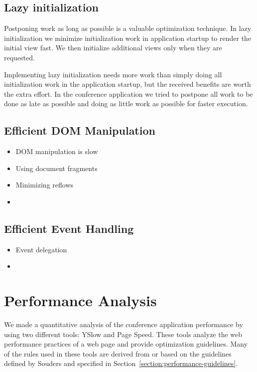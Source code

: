 \subsection{Lazy initialization}

Postponing work as long as possible is a valuable optimization
technique. In lazy initialization we minimize initialization work in
application startup to render the initial view fast. We then
initialize additional views only when they are requested.

Implementing lazy initialization needs more work than simply doing all
initialization work in the application startup, but the received
benefits are worth the extra effort. In the conference application we
tried to postpone all work to be done as late as possible and doing as
little work as possible for faster execution.

\subsection{Efficient DOM Manipulation}

\begin{itemize}
\item DOM manipulation is slow
\item Using document fragments
\item Minimizing reflows
\item \cite{zakas2010high}
\end{itemize}

\subsection{Efficient Event Handling}

\begin{itemize}
\item Event delegation
\item \cite{zakas2010high}
\end{itemize}

\section{Performance Analysis}
\label{section:performance-analysis}

We made a quantitative analysis of the conference application
performance by using two different tools: YSlow and Page Speed. These
tools analyze the web performance practices of a web page and provide
optimization guidelines. Many of the rules used in these tools are
derived from or based on the guidelines defined by Souders
\cite{souders2007high, souders2009even} and specified in
Section~\ref{section:performance-guidelines}.

